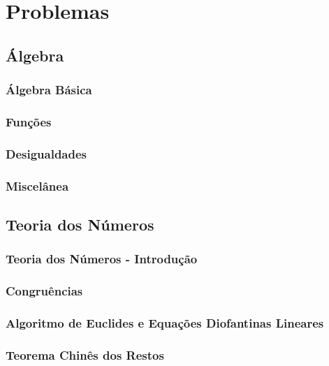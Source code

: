 \chapter{Problemas}

\section{Álgebra}
\subsection{Álgebra Básica}

\subsection{Funções}

\subsection{Desigualdades}

\subsection{Miscelânea}


\pagebreak

\section{Teoria dos Números}
\subsection{Teoria dos Números - Introdução}

\subsection{Congruências}

\subsection{Algoritmo de Euclides e Equações Diofantinas Lineares}

\subsection{Teorema Chinês dos Restos}

